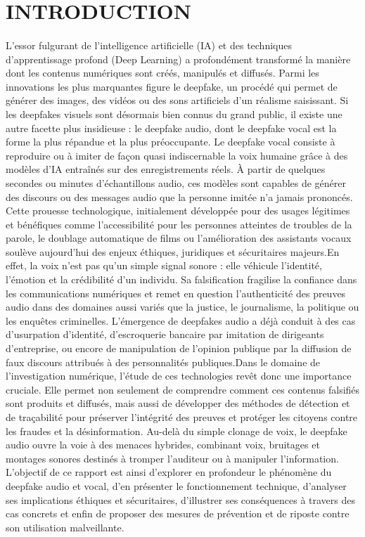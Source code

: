 \documentclass[memoire, 12pt]{report}
\begin{document}
\section*{\center \textbf{INTRODUCTION}}
\paragraph{}
L’essor fulgurant de l’intelligence artificielle (IA) et des techniques d’apprentissage profond (Deep Learning) a profondément transformé la manière dont les contenus numériques sont créés, manipulés et diffusés. Parmi les innovations les plus marquantes figure le deepfake, un procédé qui permet de générer des images, des vidéos ou des sons artificiels d’un réalisme saisissant. Si les deepfakes visuels sont désormais bien connus du grand public, il existe une autre facette plus insidieuse : le deepfake audio, dont le deepfake vocal est la forme la plus répandue et la plus préoccupante. Le deepfake vocal consiste à reproduire ou à imiter de façon quasi indiscernable la voix humaine grâce à des modèles d’IA entraînés sur des enregistrements réels. À partir de quelques secondes ou minutes d’échantillons audio, ces modèles sont capables de générer des discours ou des messages audio que la personne imitée n’a jamais prononcés. Cette prouesse technologique, initialement développée pour des usages légitimes et bénéfiques comme l’accessibilité pour les personnes atteintes de troubles de la parole, le doublage automatique de films ou l’amélioration des assistants vocaux soulève aujourd’hui des enjeux éthiques, juridiques et sécuritaires majeurs.En effet, la voix n’est pas qu’un simple signal sonore : elle véhicule l’identité, l’émotion et la crédibilité d’un individu. Sa falsification fragilise la confiance dans les communications numériques et remet en question l’authenticité des preuves audio dans des domaines aussi variés que la justice, le journalisme, la politique ou les enquêtes criminelles. L’émergence de deepfakes audio a déjà conduit à des cas d’usurpation d’identité, d’escroquerie bancaire par imitation de dirigeants d’entreprise, ou encore de manipulation de l’opinion publique par la diffusion de faux discours attribués à des personnalités publiques.Dans le domaine de l’investigation numérique, l’étude de ces technologies revêt donc une importance cruciale. Elle permet non seulement de comprendre comment ces contenus falsifiés sont produits et diffusés, mais aussi de développer des méthodes de détection et de traçabilité pour préserver l’intégrité des preuves et protéger les citoyens contre les fraudes et la désinformation. Au-delà du simple clonage de voix, le deepfake audio ouvre la voie à des menaces hybrides, combinant voix, bruitages et montages sonores destinés à tromper l’auditeur ou à manipuler l’information. L’objectif de ce rapport est ainsi d’explorer en profondeur le phénomène du deepfake audio et vocal, d’en présenter le fonctionnement technique, d’analyser ses implications éthiques et sécuritaires, d’illustrer ses conséquences à travers des cas concrets et enfin de proposer des mesures de prévention et de riposte contre son utilisation malveillante.
\newpage
\end{document}
